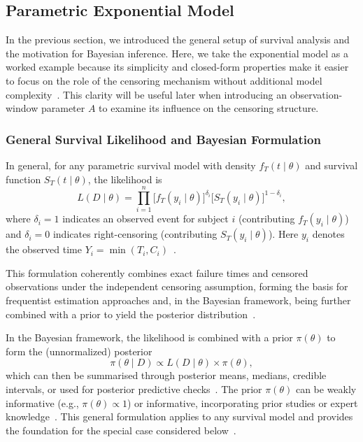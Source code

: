 \subsection{Parametric Exponential Model} \label{Exponential Model}
In the previous section, we introduced the general setup of survival analysis and the motivation for Bayesian inference. Here, we take the exponential model as a worked example because its simplicity and closed-form properties make it easier to focus on the role of the censoring mechanism without additional model complexity~\cite{kalbfleisch2002statistical, lawless2011statistical}. This clarity will be useful later when introducing an observation-window parameter $A$ to examine its influence on the censoring structure. 

\subsubsection{General Survival Likelihood and Bayesian Formulation}
In general, for any parametric survival model with density $f_T(t\mid\theta)$ and survival function $S_T(t\mid\theta)$, the likelihood is
\begin{equation}
L( D \mid \theta)
= \prod_{i=1}^n
\big[ f_T(y_i \mid \theta) \big]^{\delta_i}
\big[ S_T(y_i \mid \theta) \big]^{1 - \delta_i},
\label{eq:8}
\end{equation}
where $\delta_i=1$ indicates an observed event for subject $i$ (contributing $f_T(y_i\mid\theta)$) and $\delta_i=0$ indicates right-censoring (contributing $S_T(y_i\mid\theta)$). Here $y_i$ denotes the observed time $Y_i=\min(T_i,C_i)$~\cite{ibrahim2013bayesian}. 

This formulation coherently combines exact failure times and censored observations under the independent censoring assumption, forming the basis for frequentist estimation approaches and, in the Bayesian framework, being further combined with a prior to yield the posterior distribution~\cite{kalbfleisch2002statistical}.

In the Bayesian framework, the likelihood is combined with a prior $\pi(\theta)$ to form the (unnormalized) posterior
\begin{equation}
\pi(\theta \mid D)
\propto
L(D \mid \theta)\times \pi(\theta),
\end{equation}
which can then be summarised through posterior means, medians, credible intervals, or used for posterior predictive checks~\cite{ibrahim2013bayesian}. The prior $\pi(\theta)$ can be weakly informative (e.g., $\pi(\theta) \propto 1$) or informative, incorporating prior studies or expert knowledge~\cite{carlin1997bayes}. This general formulation applies to any survival model and provides the foundation for the special case considered below~\cite{bernardo1994bayesian}.

